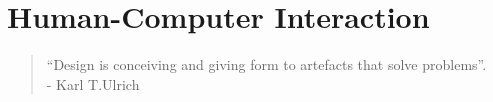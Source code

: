\section{Human-Computer Interaction}
\label{sec:hcitheory}
\begin{quotation}
 ``Design is conceiving and giving form to artefacts that solve problems''. \\
 - Karl T.Ulrich
\end{quotation}
 



